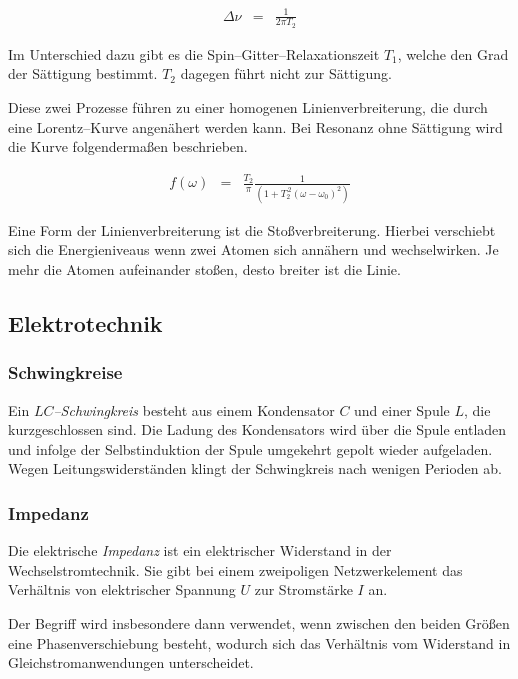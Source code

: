 \documentclass[12pt,a4paper]{scrartcl}
\numberwithin{equation}{section} %
\begin{document}
\begin{eqnarray}
	\Delta \nu &=& \frac{1}{2 \pi T_2}
\end{eqnarray}

\noindent
Im Unterschied dazu gibt es die Spin--Gitter--Relaxationszeit $T_1$, welche den Grad der Sättigung bestimmt. $T_2$ dagegen führt nicht zur Sättigung.

Diese zwei Prozesse führen zu einer homogenen Linienverbreiterung, die durch eine Lorentz--Kurve angenähert werden kann. Bei Resonanz ohne Sättigung wird die Kurve folgendermaßen beschrieben. \cite{Bern}

\begin{eqnarray}
	f(\omega) &=& \frac{T_2}{\pi}\frac{1}{(1+T_2^{\,2} (\omega - \omega _0)^2)}
\end{eqnarray}

\noindent
Eine Form der Linienverbreiterung ist die Stoßverbreiterung. Hierbei verschiebt sich die Energieniveaus wenn zwei Atomen sich annähern und wechselwirken. Je mehr die Atomen aufeinander stoßen, desto breiter ist die Linie.

\hypertarget{elektrotechnik}{%
\subsection{Elektrotechnik}\label{elektrotechnik}}

\hypertarget{schwingkreise}{%
\subsubsection{Schwingkreise}\label{schwingkreise}}

Ein \emph{$LC$--Schwingkreis} besteht aus einem Kondensator $C$ und einer Spule $L$, die kurzgeschlossen sind. Die Ladung des Kondensators wird über die Spule entladen und infolge der Selbstinduktion der Spule umgekehrt gepolt wieder aufgeladen. Wegen Leitungswiderständen klingt der Schwingkreis nach wenigen Perioden ab.

\hypertarget{impedanz}{%
\subsubsection{Impedanz}\label{impedanz}}

Die elektrische \emph{Impedanz} ist ein elektrischer Widerstand in der Wechselstromtechnik. Sie gibt bei einem zweipoligen Netzwerkelement das Verhältnis von elektrischer Spannung $U$ zur Stromstärke $I$ an.

Der Begriff wird insbesondere dann verwendet, wenn zwischen den beiden Größen eine Phasenverschiebung besteht, wodurch sich das Verhältnis vom Widerstand in Gleichstromanwendungen unterscheidet.
\end{document}
